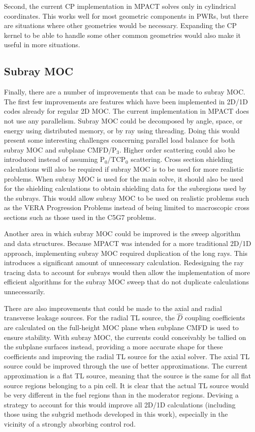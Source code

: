 Second, the current CP implementation in MPACT solves only in cylindrical coordinates.  This works well for most geometric components in PWRs, but there are situations where other geometries would be necessary.  Expanding the CP kernel to be able to handle some other common geometries would also make it useful in more situations.

\subsection{Subray MOC}

Finally, there are a number of improvements that can be made to subray MOC.  The first few improvements are features which have been implemented in 2D/1D codes already for regular 2D MOC.  The current implementation in MPACT does not use any parallelism.  Subray MOC could be decomposed by angle, space, or energy using distributed memory, or by ray using threading.  Doing this would present some interesting challenges concerning parallel load balance for both subray MOC and subplane CMFD/P$_3$.  Higher order scattering could also be introduced instead of assuming P$_0$/TCP$_0$ scattering.  Cross section shielding calculations will also be required if subray MOC is to be used for more realistic problems.  When subray MOC is used for the main solve, it should also be used for the shielding calculations to obtain shielding data for the subregions used by the subrays.  This would allow subray MOC to be used on realistic problems such as the VERA Progression Problems instead of being limited to macroscopic cross sections such as those used in the C5G7 problems.

Another area in which subray MOC could be improved is the sweep algorithm and data structures.  Because MPACT was intended for a more traditional 2D/1D approach, implementing subray MOC required duplication of the long rays.  This introduces a significant amount of unnecessary calculation.  Redesigning the ray tracing data to account for subrays would then allow the implementation of more efficient algorithms for the subray MOC sweep that do not duplicate calculations unnecessarily.

There are also improvements that could be made to the axial and radial transverse leakage sources.  For the radial TL source, the $\hat{D}$ coupling coefficients are calculated on the full-height MOC plane when subplane CMFD is used to ensure stability.  With subray MOC, the currents could conceivably be tallied on the subplane surfaces instead, providing a more accurate shape for these coefficients and improving the radial TL source for the axial solver.  The axial TL source could be improved through the use of better approximations.  The current approximation is a flat TL source, meaning that the source is the same for all flat source regions belonging to a pin cell.  It is clear that the actual TL source would be very different in the fuel regions than in the moderator regions.  Devising a strategy to account for this would improve all 2D/1D calculations (including those using the subgrid methods developed in this work), especially in the vicinity of a strongly absorbing control rod.

